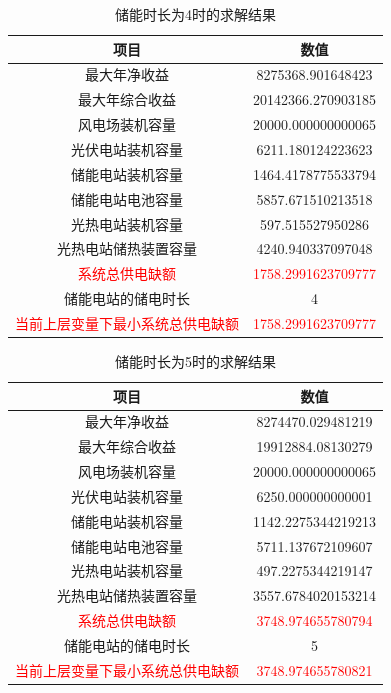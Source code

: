 \documentclass{article}
\begin{document}
\begin{table}[H]
    \centering
    \caption{储能时长为4时的求解结果}
    \label{tab:energy_system_data_4}
    \begin{tabular}{c|c}
        \toprule
        \textbf{项目} & \textbf{数值} \\
        \midrule
        最大年净收益 & 8275368.901648423 \\
        最大年综合收益 & 20142366.270903185 \\
        风电场装机容量 & 20000.000000000065 \\
        光伏电站装机容量 & 6211.180124223623 \\
        储能电站装机容量 & 1464.4178775533794 \\
        储能电站电池容量 & 5857.671510213518 \\
        光热电站装机容量 & 597.515527950286 \\
        光热电站储热装置容量 & 4240.940337097048 \\
        \textcolor{red}{系统总供电缺额} & \textcolor{red}{1758.2991623709777} \\
        储能电站的储电时长 & 4 \\
        \textcolor{red}{当前上层变量下最小系统总供电缺额} & \textcolor{red}{1758.2991623709777} \\
        \bottomrule
    \end{tabular}
\end{table}

\begin{table}[H]
    \centering
    \caption{储能时长为5时的求解结果}
    \label{tab:energy_system_data_5}
    \begin{tabular}{c|c}
        \toprule
        \textbf{项目} & \textbf{数值} \\
        \midrule
        最大年净收益 & 8274470.029481219 \\
        最大年综合收益 & 19912884.08130279 \\
        风电场装机容量 & 20000.000000000065 \\
        光伏电站装机容量 & 6250.000000000001 \\
        储能电站装机容量 & 1142.2275344219213 \\
        储能电站电池容量 & 5711.137672109607 \\
        光热电站装机容量 & 497.2275344219147 \\
        光热电站储热装置容量 & 3557.6784020153214 \\
        \textcolor{red}{系统总供电缺额} & \textcolor{red}{3748.974655780794} \\
        储能电站的储电时长 & 5 \\
        \textcolor{red}{当前上层变量下最小系统总供电缺额} & \textcolor{red}{3748.974655780821} \\
        \bottomrule
    \end{tabular}
\end{table}
\end{document}
